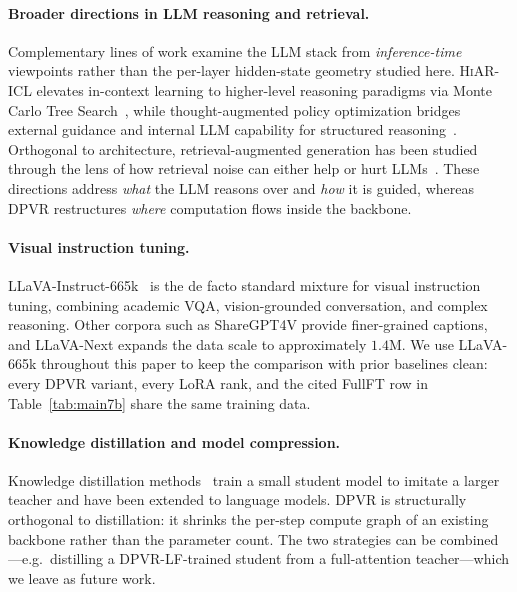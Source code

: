 \documentclass[a4paper,fleqn,review]{cas-sc}
\newcommand{\dpvr}{DPVR}
\newcommand{\dpvrlf}{DPVR-LF}
\begin{document}
\paragraph{Broader directions in LLM reasoning and retrieval.}
Complementary lines of work examine the LLM stack from
\emph{inference-time} viewpoints rather than the per-layer
hidden-state geometry studied here. \textsc{HiAR-ICL} elevates
in-context learning to higher-level reasoning paradigms via Monte
Carlo Tree Search~\citep{wu2024beyond}, while thought-augmented
policy optimization bridges external guidance and internal LLM
capability for structured reasoning~\citep{wu2025thought}. Orthogonal
to architecture, retrieval-augmented generation has been studied
through the lens of how retrieval noise can either help or hurt
LLMs~\citep{wu2025pandora}. These directions address \emph{what} the
LLM reasons over and \emph{how} it is guided, whereas \dpvr{}
restructures \emph{where} computation flows inside the backbone.

\paragraph{Visual instruction tuning.}
LLaVA-Instruct-665k~\citep{liu2024llava15} is the de facto standard
mixture for visual instruction tuning, combining academic VQA,
vision-grounded conversation, and complex reasoning. Other corpora
such as ShareGPT4V provide finer-grained captions, and LLaVA-Next
expands the data scale to approximately $1.4$M. We use LLaVA-665k throughout
this paper to keep the comparison with prior baselines clean: every
\dpvr{} variant, every LoRA rank, and the cited FullFT row in
Table~\ref{tab:main7b} share the same training data.

\paragraph{Knowledge distillation and model compression.}
Knowledge distillation
methods~\citep{hinton2015distillation, sanh2019distilbert} train a
small student model to imitate a larger teacher and have been
extended to language models. \dpvr{} is structurally orthogonal to
distillation: it shrinks the per-step compute graph of an existing
backbone rather than the parameter count. The two strategies can be
combined---e.g.\ distilling a \dpvrlf{}-trained student from a
full-attention teacher---which we leave as future work.
\end{document}

